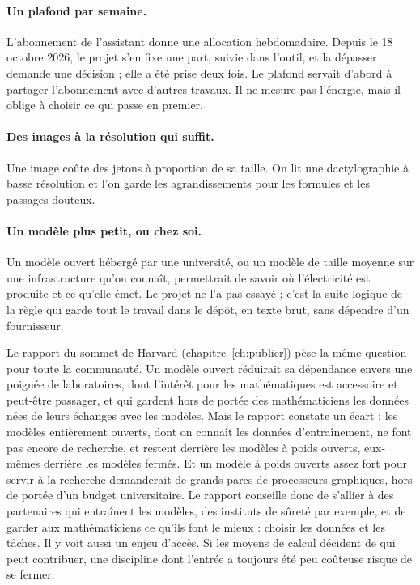 \paragraph{Un plafond par semaine.} L'abonnement de l'assistant donne une allocation
hebdomadaire. Depuis le 18 octobre 2026, le projet s'en fixe une part, suivie dans l'outil,
et la dépasser demande une décision ; elle a été prise deux fois. Le plafond servait
d'abord à partager l'abonnement avec d'autres travaux. Il ne mesure pas l'énergie, mais il
oblige à choisir ce qui passe en premier.

\paragraph{Des images à la résolution qui suffit.} Une image coûte des jetons à proportion
de sa taille. On lit une dactylographie à basse résolution et l'on garde les
agrandissements pour les formules et les passages douteux.

\paragraph{Un modèle plus petit, ou chez soi.} Un modèle ouvert hébergé par une université,
ou un modèle de taille moyenne sur une infrastructure qu'on connaît, permettrait de savoir
où l'électricité est produite et ce qu'elle émet. Le projet ne l'a pas essayé ; c'est la
suite logique de la règle qui garde tout le travail dans le dépôt, en texte brut, sans
dépendre d'un fournisseur.

Le rapport du sommet de Harvard (chapitre~\ref{ch:publier}) pèse la même question pour
toute la communauté. Un modèle ouvert réduirait sa dépendance envers une poignée de
laboratoires, dont l'intérêt pour les mathématiques est accessoire et peut-être passager, et
qui gardent hors de portée des mathématiciens les données nées de leurs échanges avec les
modèles. Mais le rapport constate un écart : les modèles entièrement ouverts, dont on connaît
les données d'entraînement, ne font pas encore de recherche, et restent derrière les modèles
à poids ouverts, eux-mêmes derrière les modèles fermés. Et un modèle à poids ouverts assez
fort pour servir à la recherche demanderait de grands parcs de processeurs graphiques, hors
de portée d'un budget universitaire. Le rapport conseille donc de s'allier à des partenaires
qui entraînent les modèles, des instituts de sûreté par exemple, et de garder aux
mathématiciens ce qu'ils font le mieux : choisir les données et les tâches. Il y voit aussi
un enjeu d'accès. Si les moyens de calcul décident de qui peut contribuer, une discipline
dont l'entrée a toujours été peu coûteuse risque de se fermer.


